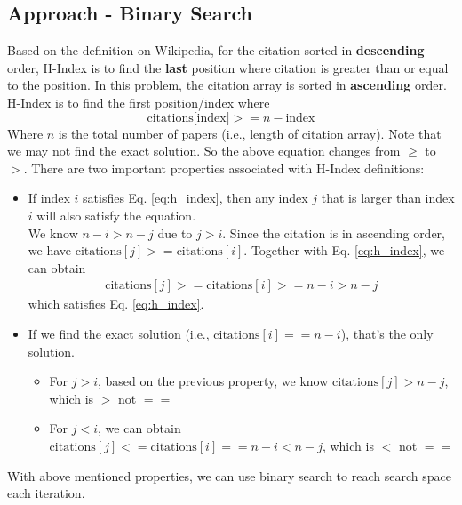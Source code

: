 \documentclass[justified]{tufte-book}
\begin{document}
\subsection{Approach - Binary Search}
Based on the definition on Wikipedia, for the citation sorted in \textbf{descending} order, H-Index is to find the \textbf{last} position where citation is greater than or equal to the position. In this problem, the citation array is sorted in \textbf{ascending} order. H-Index is to find the first position/index where 
\begin{equation} 
    \text{citations[index]} >= n - \text{index} \label{eq:h_index}
\end{equation}
Where $n$ is the total number of papers (i.e., length of citation array). Note that we may not find the exact solution. So the above equation changes from $\geq$ to $>$. There are two important properties associated with H-Index definitions:
\begin{itemize}
    \item If index $i$ satisfies Eq. \ref{eq:h_index}, then any index $j$ that is larger than index $i$ will also satisfy the equation. \\
    We know $n - i > n - j$ due to $j > i$. Since the citation is in ascending order, we have $\text{citations}[j] >= \text{citations}[i]$. Together with Eq. \ref{eq:h_index}, we can obtain
    \begin{eqnarray*}
        \text{citations}[j] >= \text{citations}[i] >= n - i > n - j
    \end{eqnarray*}
    which satisfies Eq. \ref{eq:h_index}.
    \item If we find the exact solution (i.e., $        \text{citations}[i] == n - i$), that's the only solution.
    \begin{itemize}
        \item For $j > i$, based on the previous property, we know $\text{citations}[j] > n - j$, which is $>$ not $==$
        \item For $j < i$, we can obtain $        \text{citations}[j] <= \text{citations}[i] == n - i < n - j$, which is $<$ not $==$
    \end{itemize}
\end{itemize}
With above mentioned properties, we can use binary search to reach search space each iteration. 
\end{document}
